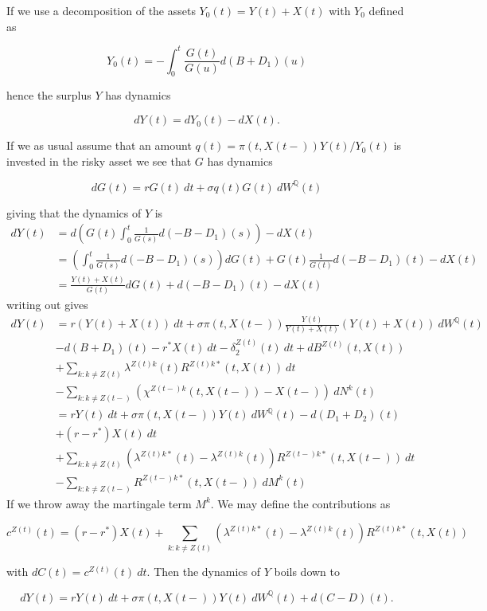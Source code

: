 \documentclass[a4paper,10pt,openany]{book}
\begin{document}
If we use a decomposition of the assets \(Y_0(t)=Y(t)+X(t)\) with \(Y_0\) defined as

\[
Y_0(t)=-\int_0^t\frac{G(t)}{G(u)}d(B+D_1)(u)
\]

hence the surplus \(Y\) has dynamics

\[
dY(t)=dY_0(t)-dX(t).
\]

If we as usual assume that an amount \(q(t)=\pi(t,X(t-))Y(t)/Y_0(t)\) is invested in the risky asset we see that \(G\) has dynamics

\[
dG(t)=rG(t)\ dt + \sigma q(t) G(t)\ dW^{\mathbb Q}(t)
\]

giving that the dynamics of \(Y\) is
\begin{align*}
dY(t)&=d\left(G(t)\int_0^t\frac{1}{G(s)}d(-B-D_1)(s)\right)-dX(t)\\
&=\left(\int_0^t\frac{1}{G(s)}d(-B-D_1)(s)\right)dG(t)+G(t)\frac{1}{G(t)}d(-B-D_1)(t)-dX(t)\\
&=\frac{Y(t)+X(t)}{G(t)}dG(t)+d(-B-D_1)(t)-dX(t)
\end{align*}
writing out gives
\begin{align*}
dY(t)&=r(Y(t)+X(t))\ dt + \sigma \pi(t,X(t-))\frac{Y(t)}{Y(t)+X(t)} (Y(t)+X(t))\ dW^{\mathbb Q}(t)\\
&-d(B+D_1)(t)-r^*X(t)\ dt-\delta_2^{Z(t)}(t)\ dt+dB^{Z(t)}(t,X(t))\\
&+\sum_{k:k\ne Z(t)}\lambda^{Z(t)k}(t)R^{Z(t)k*}(t,X(t))\ dt\\
&-\sum_{k:k\ne Z(t-)}\left(\chi^{Z(t-)k}(t,X(t-))-X(t-)\right)\ dN^k(t)\\
&=rY(t)\ dt+\sigma \pi(t,X(t-))Y(t)\ dW^{\mathbb Q}(t)-d(D_1+D_2)(t)\\
&+(r-r^*)X(t)\ dt\\
&+\sum_{k:k\ne Z(t)}\left(\lambda^{Z(t)k*}(t)-\lambda^{Z(t)k}(t)\right)R^{Z(t-)k*}(t,X(t-))\ dt\\
&-\sum_{k:k\ne Z(t-)}R^{Z(t-)k*}(t,X(t-))\ dM^k(t)
\end{align*}
If we throw away the martingale term \(M^k\). We may define the contributions as

\[
c^{Z(t)}(t)=(r-r^*)X(t) +\sum_{k:k\ne Z(t)}\left(\lambda^{Z(t)k*}(t)-\lambda^{Z(t)k}(t)\right)R^{Z(t)k*}(t,X(t))
\]

with \(dC(t)=c^{Z(t)}(t)\ dt\). Then the dynamics of \(Y\) boils down to

\[
dY(t)=rY(t)\ dt+\sigma \pi(t,X(t-))Y(t)\ dW^{\mathbb Q}(t)+d(C-D)(t).
\]
\end{document}
